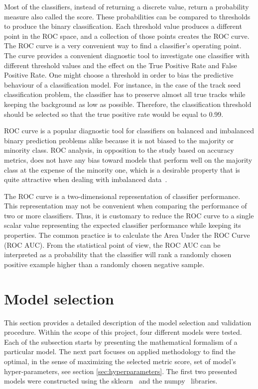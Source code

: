 Most of the classifiers, instead of returning a discrete value, return a probability measure also called the score. These probabilities can be compared to thresholds to produce the binary classification.  Each threshold value produces a different point in the ROC space, and a collection of those points creates the ROC curve. The ROC curve is a very convenient way to find a classifier's operating point. 
The curve provides a convenient diagnostic tool to investigate one classifier with different threshold values and the effect on the True Positive Rate and False Positive Rate. One might choose a threshold in order to bias the predictive behaviour of a classification model. For instance, in the case of the track seed classification problem, the classifier has to preserve almost all true tracks while keeping the background as low as possible. Therefore, the classification threshold should be selected so that the true positive rate would be equal to 0.99.  

ROC curve is a popular diagnostic tool for classifiers on balanced and imbalanced binary prediction problems alike because it is not biased to the majority or minority class. ROC analysis, in opposition to the study based on accuracy metrics, does not have any bias toward models that perform well on the majority class at the expense of the minority one, which is a desirable property that is quite attractive when dealing with imbalanced data~\cite{imbalanced_learnig}.

The ROC curve is a two-dimensional representation of classifier performance. This representation may not be convenient when comparing the performance of two or more classifiers.  
 Thus, it is customary to reduce the ROC curve to a single scalar value representing the expected classifier performance while keeping its properties. The common practice is to calculate the Area Under the ROC Curve (ROC AUC).  From the statistical point of view, the ROC AUC can be interpreted as a probability that the classifier will rank a randomly chosen positive example higher than a randomly chosen negative sample. 

\section{Model selection}

This section provides a detailed description of the model selection and validation procedure. Within the scope of this project, four different models were tested. Each of the subsection starts by presenting the mathematical formalism of a particular model. The next part focuses on applied methodology to find the optimal, in the sense of maximizing the selected metric score, set of model's hyper-parameters, see section \ref{sec:hyperparameters}. 
The first two presented models were constructed using the sklearn~\cite{sklearn} and the numpy~\cite{numpy} libraries. 

